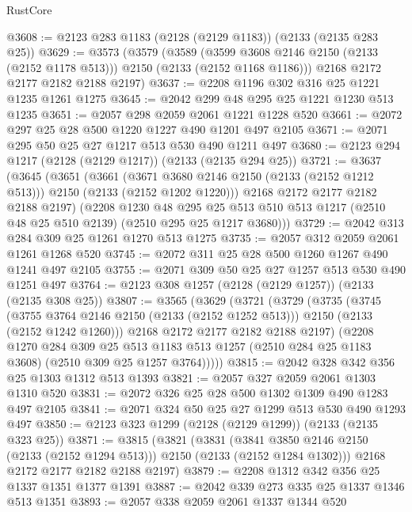 \begin{lexlean}{RustCore}
\begin{coremodule}
@3608 := @2123 @283 @1183 (@2128 (@2129 @1183)) (@2133 (@2135 @283 @25))
@3629 := @3573
    (@3579
      (@3589 (@3599 @3608 @2146 @2150 (@2133 (@2152 @1178 @513))) @2150 (@2133 (@2152 @1168 @1186)))
      @2168
      @2172
      @2177
      @2182
      @2188
      @2197)
@3637 := @2208 @1196 @302 @316 @25 @1221 @1235 @1261 @1275
@3645 := @2042 @299 @48 @295 @25 @1221 @1230 @513 @1235
@3651 := @2057 @298 @2059 @2061 @1221 @1228 @520
@3661 := @2072 @297 @25 @28 @500 @1220 @1227 @490 @1201 @497 @2105
@3671 := @2071 @295 @50 @25 @27 @1217 @513 @530 @490 @1211 @497
@3680 := @2123 @294 @1217 (@2128 (@2129 @1217)) (@2133 (@2135 @294 @25))
@3721 := @3637
    (@3645
      (@3651
        (@3661
          (@3671 @3680 @2146 @2150 (@2133 (@2152 @1212 @513)))
          @2150
          (@2133 (@2152 @1202 @1220)))
        @2168
        @2172
        @2177
        @2182
        @2188
        @2197)
      (@2208
        @1230
        @48
        @295
        @25
        @513
        @510
        @513
        @1217
        (@2510 @48 @25 @510 @2139)
        (@2510 @295 @25 @1217 @3680)))
@3729 := @2042 @313 @284 @309 @25 @1261 @1270 @513 @1275
@3735 := @2057 @312 @2059 @2061 @1261 @1268 @520
@3745 := @2072 @311 @25 @28 @500 @1260 @1267 @490 @1241 @497 @2105
@3755 := @2071 @309 @50 @25 @27 @1257 @513 @530 @490 @1251 @497
@3764 := @2123 @308 @1257 (@2128 (@2129 @1257)) (@2133 (@2135 @308 @25))
@3807 := @3565
    (@3629
      (@3721
        (@3729
          (@3735
            (@3745
              (@3755 @3764 @2146 @2150 (@2133 (@2152 @1252 @513)))
              @2150
              (@2133 (@2152 @1242 @1260)))
            @2168
            @2172
            @2177
            @2182
            @2188
            @2197)
          (@2208
            @1270
            @284
            @309
            @25
            @513
            @1183
            @513
            @1257
            (@2510 @284 @25 @1183 @3608)
            (@2510 @309 @25 @1257 @3764)))))
@3815 := @2042 @328 @342 @356 @25 @1303 @1312 @513 @1393
@3821 := @2057 @327 @2059 @2061 @1303 @1310 @520
@3831 := @2072 @326 @25 @28 @500 @1302 @1309 @490 @1283 @497 @2105
@3841 := @2071 @324 @50 @25 @27 @1299 @513 @530 @490 @1293 @497
@3850 := @2123 @323 @1299 (@2128 (@2129 @1299)) (@2133 (@2135 @323 @25))
@3871 := @3815
    (@3821
      (@3831 (@3841 @3850 @2146 @2150 (@2133 (@2152 @1294 @513))) @2150 (@2133 (@2152 @1284 @1302)))
      @2168
      @2172
      @2177
      @2182
      @2188
      @2197)
@3879 := @2208 @1312 @342 @356 @25 @1337 @1351 @1377 @1391
@3887 := @2042 @339 @273 @335 @25 @1337 @1346 @513 @1351
@3893 := @2057 @338 @2059 @2061 @1337 @1344 @520

\end{coremodule}
\end{lexlean}

